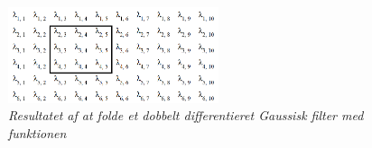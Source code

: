 \begin{figure}[H]
    \centering
    \includegraphics[width=0.55\textwidth]{fig/dataindsamlingsvinduepic.png}
    \vspace{-1em}   
    \begin{center}
    \caption{{\footnotesize \textit{
     Resultatet af at folde et dobbelt differentieret Gaussisk filter med funktionen}}}
    \label{fig:dataindvin}
     \end{center}
    \vspace{-2.5em}  
  \end{figure}
\noindent